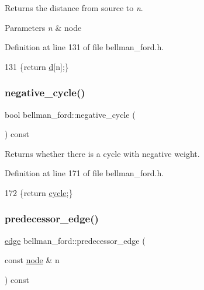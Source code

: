 Returns the distance from source to {\itshape n}. 


\begin{DoxyParams}{Parameters}
{\em n} & node \\
\hline
\end{DoxyParams}


Definition at line 131 of file bellman\+\_\+ford.\+h.


\begin{DoxyCode}
131 \{\textcolor{keywordflow}{return} \mbox{\hyperlink{classbellman__ford_a0e3b99854a3f998f8ef6cde6fb902040}{d}}[n];\}
\end{DoxyCode}
\mbox{\label{classbellman__ford_af9cd8be38bb1504089997581d9aa4f64}} 
\subsubsection{\texorpdfstring{negative\+\_\+cycle()}{negative\_cycle()}}
{\footnotesize\ttfamily bool bellman\+\_\+ford\+::negative\+\_\+cycle (\begin{DoxyParamCaption}{ }\end{DoxyParamCaption}) const\hspace{0.3cm}{\ttfamily [inline]}}



Returns whether there is a cycle with negative weight. 



Definition at line 171 of file bellman\+\_\+ford.\+h.


\begin{DoxyCode}
172     \{\textcolor{keywordflow}{return} \mbox{\hyperlink{classbellman__ford_aa2168afff14546b2fd99d2b52681156b}{cycle}};\}
\end{DoxyCode}
\mbox{\label{classbellman__ford_a39f93b0b1e427cf26059fa6141c6f61c}} 
\subsubsection{\texorpdfstring{predecessor\+\_\+edge()}{predecessor\_edge()}}
{\footnotesize\ttfamily \mbox{\hyperlink{classedge}{edge}} bellman\+\_\+ford\+::predecessor\+\_\+edge (\begin{DoxyParamCaption}\item[{const \mbox{\hyperlink{classnode}{node}} \&}]{n }\end{DoxyParamCaption}) const\hspace{0.3cm}{\ttfamily [inline]}}



